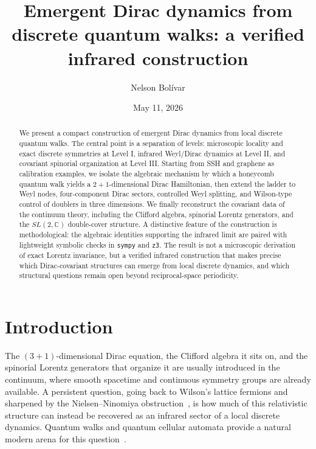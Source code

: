 \documentclass[a4paper,onecolumn,11pt]{quantumarticle}
\title{Emergent Dirac dynamics from discrete quantum walks: a verified infrared construction}
\author{Nelson Bol\'ivar}
\affiliation{Astrum Drive Technologies, astrumdrivetechnologies@gmail.com}
\date{May 11, 2026}
\newcommand{\bbC}{\ensuremath{\mathbb{C}}}
\begin{document}
\maketitle

\begin{abstract}
We present a compact construction of emergent Dirac dynamics from local discrete quantum walks. The central point is a separation of levels: microscopic locality and exact discrete symmetries at Level I, infrared Weyl/Dirac dynamics at Level II, and covariant spinorial organization at Level III. Starting from SSH and graphene as calibration examples, we isolate the algebraic mechanism by which a honeycomb quantum walk yields a $2{+}1$-dimensional Dirac Hamiltonian, then extend the ladder to Weyl nodes, four-component Dirac sectors, controlled Weyl splitting, and Wilson-type control of doublers in three dimensions. We finally reconstruct the covariant data of the continuum theory, including the Clifford algebra, spinorial Lorentz generators, and the $SL(2,\bbC)$ double-cover structure. A distinctive feature of the construction is methodological: the algebraic identities supporting the infrared limit are paired with lightweight symbolic checks in \texttt{sympy} and \texttt{z3}. The result is not a microscopic derivation of exact Lorentz invariance, but a verified infrared construction that makes precise which Dirac-covariant structures can emerge from local discrete dynamics, and which structural questions remain open beyond reciprocal-space periodicity.
\end{abstract}


\section{Introduction}
\label{p:intro}

The $(3+1)$-dimensional Dirac equation, the Clifford algebra it sits on, and the spinorial Lorentz generators that organize it are usually introduced in the continuum, where smooth spacetime and continuous symmetry groups are already available. A persistent question, going back to Wilson's lattice fermions and sharpened by the Nielsen--Ninomiya obstruction~\cite{Wilson1974,NielsenNinomiya1981a,NielsenNinomiya1981b}, is how much of this relativistic structure can instead be recovered as an infrared sector of a local discrete dynamics. Quantum walks and quantum cellular automata provide a natural modern arena for this question~\cite{Arrighi2018,FarrellyShort2014,Farrelly2020}.
\end{document}
